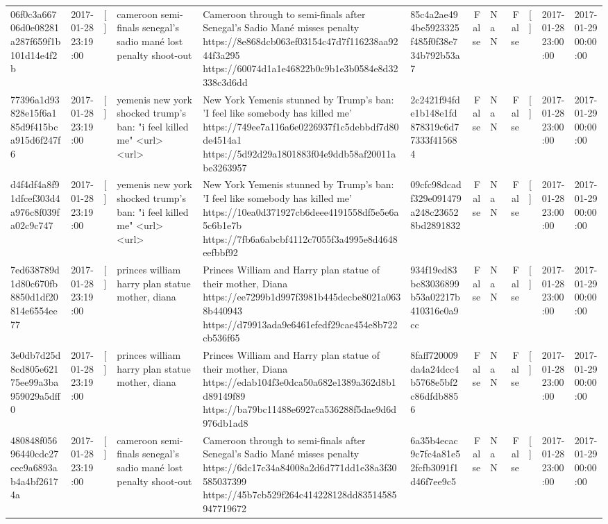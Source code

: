 \begin{tabular}{llllllrlrlll}
06f0c3a66706d0e08281a287f659f1b101d14e4f2b & 2017-01-28 23:19:00 & [] & cameroon semi-finals senegal's sadio mané lost penalty shoot-out & Cameroon through to semi-finals after Senegal’s Sadio Mané misses penalty https://8e868dcb063ef03154c47d7f116238aa9244f3a295 https://60074d1a1e46822b0c9b1e3b0584e8d32338c3d6dd & 85c4a2ae494be5923325f485f0f38e734b792b53a7 & False & NaN & False & [] & 2017-01-28 23:00:00 & 2017-01-29 00:00:00 \\
77396a1d93828e15f6a185d9f415bca915d6f247f6 & 2017-01-28 23:19:00 & [] & yemenis new york shocked trump's ban: "i feel killed me" <url> <url> & New York Yemenis stunned by Trump's ban: 'I feel like somebody has killed me' https://749ee7a116a6e0226937f1c5debbdf7d80de4514a1 https://5d92d29a1801883f04e9ddb58af20011abe3263957 & 2c2421f94fde1b148e1fd878319c6d77333f415684 & False & NaN & False & [] & 2017-01-28 23:00:00 & 2017-01-29 00:00:00 \\
d4f4df4a8f91dfcef303d4a976c8f039fa02c9c747 & 2017-01-28 23:19:00 & [] & yemenis new york shocked trump's ban: "i feel killed me" <url> <url> & New York Yemenis stunned by Trump's ban: 'I feel like somebody has killed me' https://10ea0d371927cb6deee4191558df5e5e6a5c6b1e7b https://7fb6a6abcbf4112c7055f3a4995e8d4648eefbbf92 & 09cfc98dcadf329e091479a248c236528bd2891832 & False & NaN & False & [] & 2017-01-28 23:00:00 & 2017-01-29 00:00:00 \\
7ed638789d1d80c670fb8850d1df20814e6554ee77 & 2017-01-28 23:19:00 & [] & princes william harry plan statue mother, diana & Princes William and Harry plan statue of their mother, Diana https://ee7299b1d997f3981b445decbe8021a0638b440943 https://d79913ada9e6461efedf29cae454e8b722cb536f65 & 934f19ed83bc83036899b53a02217b410316e0a9cc & False & NaN & False & [] & 2017-01-28 23:00:00 & 2017-01-29 00:00:00 \\
3e0db7d25d8cd805e62175ee99a3ba959029a5dff0 & 2017-01-28 23:19:00 & [] & princes william harry plan statue mother, diana & Princes William and Harry plan statue of their mother, Diana https://edab104f3e0dca50a682e1389a362d8b1d89149f89 https://ba79bc11488e6927ca536288f5dae9d6d976db1ad8 & 8faff720009da4a24dcc4b5768e5bf2c86dfdb8856 & False & NaN & False & [] & 2017-01-28 23:00:00 & 2017-01-29 00:00:00 \\
480848f05696440cdc27cec9a6893ab4a4bf26174a & 2017-01-28 23:19:00 & [] & cameroon semi-finals senegal's sadio mané lost penalty shoot-out & Cameroon through to semi-finals after Senegal’s Sadio Mané misses penalty https://6dc17c34a84008a2d6d771dd1e38a3f30585037399 https://45b7cb529f264c414228128dd83514585947719672 & 6a35b4ecac9c7fc4a81e52fcfb3091f1d46f7ee9c5 & False & NaN & False & [] & 2017-01-28 23:00:00 & 2017-01-29 00:00:00 \\

\end{tabular}
